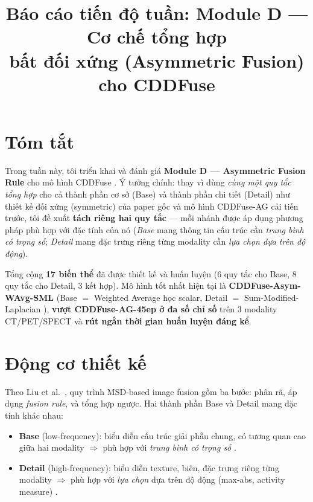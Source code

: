 \documentclass[12pt,a4paper]{article}
\title{Báo cáo tiến độ tuần: Module D --- Cơ chế tổng hợp\\bất đối xứng (Asymmetric Fusion) cho CDDFuse}
\author{}
\date{}
\begin{document}
\maketitle

\section*{Tóm tắt}

Trong tuần này, tôi triển khai và đánh giá \textbf{Module D --- Asymmetric Fusion Rule} cho mô hình CDDFuse \cite{zhao2023cddfuse}. Ý tưởng chính: thay vì dùng \emph{cùng một quy tắc tổng hợp} cho cả thành phần cơ sở (Base) và thành phần chi tiết (Detail) như thiết kế đối xứng (symmetric) của paper gốc và mô hình CDDFuse-AG cải tiến trước, tôi đề xuất \textbf{tách riêng hai quy tắc} --- mỗi nhánh được áp dụng phương pháp phù hợp với đặc tính của nó (\emph{Base} mang thông tin cấu trúc cần \emph{trung bình có trọng số}; \emph{Detail} mang đặc trưng riêng từng modality cần \emph{lựa chọn dựa trên độ động}).

Tổng cộng \textbf{17 biến thể} đã được thiết kế và huấn luyện (6 quy tắc cho Base, 8 quy tắc cho Detail, 3 kết hợp). Mô hình tốt nhất hiện tại là \textbf{CDDFuse-Asym-WAvg-SML} (Base $=$ Weighted Average học scalar, Detail $=$ Sum-Modified-Laplacian \cite{huang2007sml}), \textbf{vượt CDDFuse-AG-45ep ở đa số chỉ số} trên 3 modality CT/PET/SPECT và \textbf{rút ngắn thời gian huấn luyện đáng kể}.

\section{Động cơ thiết kế}

Theo Liu et al.\ \cite{liu2018survey}, quy trình MSD-based image fusion gồm ba bước: phân rã, áp dụng \emph{fusion rule}, và tổng hợp ngược. Hai thành phần Base và Detail mang đặc tính khác nhau:
\begin{itemize}\itemsep0pt
    \item \textbf{Base} (low-frequency): biểu diễn cấu trúc giải phẫu chung, có tương quan cao giữa hai modality $\Rightarrow$ phù hợp với \emph{trung bình có trọng số} \cite{burt1983laplacian}.
    \item \textbf{Detail} (high-frequency): biểu diễn texture, biên, đặc trưng riêng từng modality $\Rightarrow$ phù hợp với \emph{lựa chọn} dựa trên độ động (max-abs, activity measure) \cite{li1995wavelet, huang2007sml}.
\end{itemize}
\end{document}
